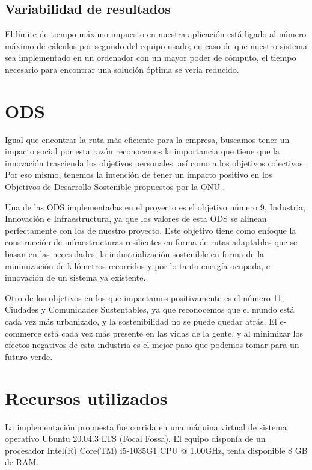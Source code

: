 \documentclass[journal]{IEEEtran}
\begin{document}
        \subsection{Variabilidad de resultados}

            El límite de tiempo máximo impuesto en nuestra aplicación está ligado al número máximo de cálculos por segundo del equipo usado; en caso de que nuestro sistema sea implementado en un ordenador con un mayor poder de cómputo, el tiempo necesario para encontrar una solución óptima se vería reducido.
        
    \section{ODS}
    
        Igual que encontrar la ruta más eficiente para la empresa, buscamos tener un impacto social por esta razón reconocemos la importancia que tiene que la innovación trascienda los objetivos personales, así como a los objetivos colectivos. Por eso mismo, tenemos la intención de tener un impacto positivo en los Objetivos de Desarrollo Sostenible propuestos por la ONU \cite{united-nations-2015}. 
        
        Una de las ODS implementadas en el proyecto es el objetivo número 9,  Industria, Innovación e Infraestructura, ya que los valores de esta ODS se alinean perfectamente con los de nuestro proyecto. Este objetivo tiene como enfoque la construcción de infraestructuras resilientes en forma de rutas adaptables que se basan en las necesidades, la industrialización sostenible en forma de la minimización de kilómetros recorridos y por lo tanto energía ocupada, e innovación de un sistema ya existente. 
        
        Otro de los objetivos en los que impactamos positivamente es el número 11, Ciudades y Comunidades Sustentables, ya que reconocemos que el mundo está cada vez más urbanizado, y la sostenibilidad no se puede quedar atrás. El e-commerce está cada vez más presente en las vidas de la gente, y al minimizar los efectos negativos de esta industria es el mejor paso que podemos tomar para un futuro verde. 

    \section{Recursos utilizados}
        
        La implementación propuesta fue corrida en una máquina virtual de sistema operativo Ubuntu 20.04.3 LTS (Focal Fossa). El equipo disponía de un procesador Intel(R) Core(TM) i5-1035G1 CPU @ 1.00GHz, tenía disponible 8 GB de RAM.
\end{document}
